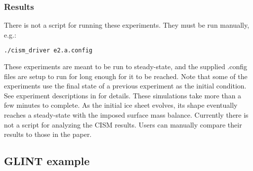 \subsubsection{Results}
\label{subsecc:eismint2_results}
There is not a script for running these experiments.  They must be run manually, e.g.: 

\texttt{./cism\_driver e2.a.config}

These experiments are meant to be run to steady-state, and the supplied .config files are setup to run for long enough for it to be reached.  
Note that some of the experiments use the final state of a previous experiment 
as the initial condition.  See experiment descriptions in \citet{Payne2000} for details.
These simulations take more than a few minutes to complete.
As the initial ice sheet evolves, its shape eventually reaches a steady-state with the imposed surface mass balance.  Currently there is not a script for analyzing the CISM results.  Users can manually compare their results to those in the \citet{Payne2000} paper.


\subsection{GLINT example}



